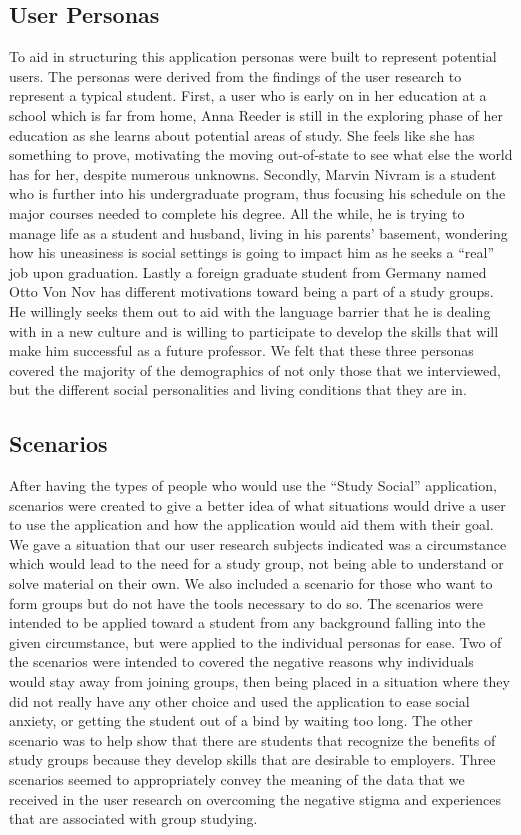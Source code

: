 \documentclass{sigchi-ext}
\begin{document}
\subsection{User Personas}

To aid in structuring this application personas were built to represent
potential users. The personas were derived from the findings of the user
research to represent a typical student. First, a user who is early on in her
education at a school which is far from home, Anna Reeder is still in the
exploring phase of her education as she learns about potential areas of study.
She feels like she has something to prove, motivating the moving out-of-state
to see what else the world has for her, despite numerous unknowns. Secondly,
Marvin Nivram is a student who is further into his undergraduate program, thus
focusing his schedule on the major courses needed to complete his degree. All
the while, he is trying to manage life as a student and husband, living in his
parents' basement, wondering how his uneasiness is social settings is going to
impact him as he seeks a ``real'' job upon graduation. Lastly a foreign graduate
student from Germany named Otto Von Nov has different motivations toward being
a part of a study groups. He willingly seeks them out to aid with the language
barrier that he is dealing with in a new culture and is willing to participate
to develop the skills that will make him successful as a future professor. We
felt that these three personas covered the majority of the demographics of not
only those that we interviewed, but the different social personalities and
living conditions that they are in.

\subsection{Scenarios}

After having the types of people who would use the ``Study Social''
application, scenarios were created to give a better idea of what situations
would drive a user to use the application and how the application would aid
them with their goal. We gave a situation that our user research subjects
indicated was a circumstance which would lead to the need for a study group,
not being able to understand or solve material on their own. We also included a
scenario for those who want to form groups but do not have the tools necessary
to do so. The scenarios were intended to be applied toward a student from any
background falling into the given circumstance, but were applied to the
individual personas for ease. Two of the scenarios were intended to covered the
negative reasons why individuals would stay away from joining groups, then
being placed in a situation where they did not really have any other choice and
used the application to ease social anxiety, or getting the student out of a
bind by waiting too long. The other scenario was to help show that there are
students that recognize the benefits of study groups because they develop
skills that are desirable to employers. Three scenarios seemed to appropriately
convey the meaning of the data that we received in the user research on
overcoming the negative stigma and experiences that are associated with group
studying.
\end{document}
